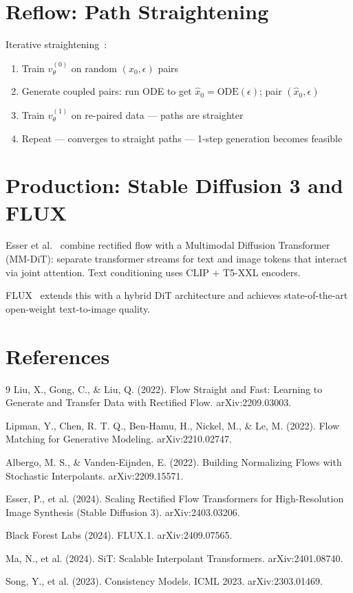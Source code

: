 \documentclass[11pt, a4paper]{article}
\theoremstyle{definition}
\begin{document}
\section{Reflow: Path Straightening}

Iterative straightening~\cite{liu2022rf}:
\begin{enumerate}
  \item Train $v_\theta^{(0)}$ on random $(x_0, \epsilon)$ pairs
  \item Generate coupled pairs: run ODE to get $\hat{x}_0 = \text{ODE}(\epsilon)$; pair $(\hat{x}_0, \epsilon)$
  \item Train $v_\theta^{(1)}$ on re-paired data — paths are straighter
  \item Repeat — converges to straight paths — 1-step generation becomes feasible
\end{enumerate}

\section{Production: Stable Diffusion 3 and FLUX}

Esser et al.~\cite{esser2024sd3} combine rectified flow with a Multimodal Diffusion Transformer
(MM-DiT): separate transformer streams for text and image tokens that interact via joint attention.
Text conditioning uses CLIP + T5-XXL encoders.

FLUX~\cite{bfl2024flux} extends this with a hybrid DiT architecture and achieves state-of-the-art
open-weight text-to-image quality.

\section*{References}
\begin{thebibliography}{9}
  Liu, X., Gong, C., \& Liu, Q. (2022). Flow Straight and Fast: Learning to Generate
  and Transfer Data with Rectified Flow. arXiv:2209.03003.

  Lipman, Y., Chen, R. T. Q., Ben-Hamu, H., Nickel, M., \& Le, M. (2022).
  Flow Matching for Generative Modeling. arXiv:2210.02747.

  Albergo, M. S., \& Vanden-Eijnden, E. (2022). Building Normalizing Flows with
  Stochastic Interpolants. arXiv:2209.15571.

  Esser, P., et al. (2024). Scaling Rectified Flow Transformers for High-Resolution
  Image Synthesis (Stable Diffusion 3). arXiv:2403.03206.

  Black Forest Labs (2024). FLUX.1. arXiv:2409.07565.

  Ma, N., et al. (2024). SiT: Scalable Interpolant Transformers. arXiv:2401.08740.

  Song, Y., et al. (2023). Consistency Models. ICML 2023. arXiv:2303.01469.
\end{thebibliography}
\end{document}
